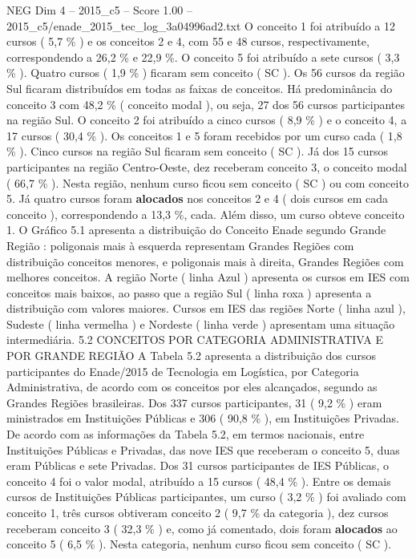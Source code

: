 \begin{textsample}{NEG Dim 4 – 2015\_c5 – Score 1.00 – 2015\_c5/enade\_2015\_tec\_log\_3a04996ad2.txt}
O conceito 1 foi atribuído a 12 cursos ( 5,7 \% ) e os conceitos 2 e 4, com 55 e 48 cursos, respectivamente, correspondendo a 26,2 \% e 22,9 \%.
O conceito 5 foi atribuído a sete cursos ( 3,3 \% ).
Quatro cursos ( 1,9 \% ) ficaram sem conceito ( SC ).
Os 56 cursos da região Sul ficaram distribuídos em todas as faixas de conceitos.
Há predominância do conceito 3 com 48,2 \% ( conceito modal ), ou seja, 27 dos 56 cursos participantes na região Sul.
O conceito 2 foi atribuído a cinco cursos ( 8,9 \% ) e o conceito 4, a 17 cursos ( 30,4 \% ).
Os conceitos 1 e 5 foram recebidos por um curso cada ( 1,8 \% ).
Cinco cursos na região Sul ficaram sem conceito ( SC ).
Já dos 15 cursos participantes na região Centro-Oeste, dez receberam conceito 3, o conceito modal ( 66,7 \% ).
Nesta região, nenhum curso ficou sem conceito ( SC ) ou com conceito 5.
Já quatro cursos foram \textbf{alocados} nos conceitos 2 e 4 ( dois cursos em cada conceito ), correspondendo a 13,3 \%, cada.
Além disso, um curso obteve conceito 1.
O Gráfico 5.1 apresenta a distribuição do Conceito Enade segundo Grande Região : poligonais mais à esquerda representam Grandes Regiões com distribuição conceitos menores, e poligonais mais à direita, Grandes Regiões com melhores conceitos.
A região Norte ( linha Azul ) apresenta os cursos em IES com conceitos mais baixos, ao passo que a região Sul ( linha roxa ) apresenta a distribuição com valores maiores.
Cursos em IES das regiões Norte ( linha azul ), Sudeste ( linha vermelha ) e Nordeste ( linha verde ) apresentam uma situação intermediária. 5.2 CONCEITOS POR CATEGORIA ADMINISTRATIVA E POR GRANDE REGIÃO A Tabela 5.2 apresenta a distribuição dos cursos participantes do Enade/2015 de Tecnologia em Logística, por Categoria Administrativa, de acordo com os conceitos por eles alcançados, segundo as Grandes Regiões brasileiras.
Dos 337 cursos participantes, 31 ( 9,2 \% ) eram ministrados em Instituições Públicas e 306 ( 90,8 \% ), em Instituições Privadas.
De acordo com as informações da Tabela 5.2, em termos nacionais, entre Instituições Públicas e Privadas, das nove IES que receberam o conceito 5, duas eram Públicas e sete Privadas.
Dos 31 cursos participantes de IES Públicas, o conceito 4 foi o valor modal, atribuído a 15 cursos ( 48,4 \% ).
Entre os demais cursos de Instituições Públicas participantes, um curso ( 3,2 \% ) foi avaliado com conceito 1, três cursos obtiveram conceito 2 ( 9,7 \% da categoria ), dez cursos receberam conceito 3 ( 32,3 \% ) e, como já comentado, dois foram \textbf{alocados} ao conceito 5 ( 6,5 \% ).
Nesta categoria, nenhum curso ficou sem conceito ( SC ).

\end{textsample}
